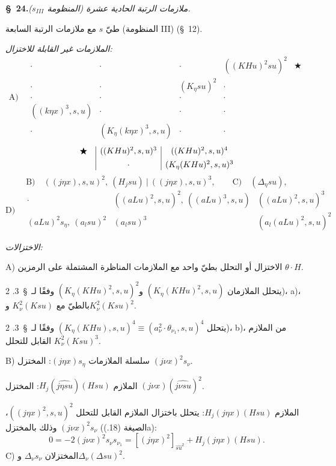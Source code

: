 \documentclass[11pt]{article}
\providecommand{\D}{\Delta}
\begin{document}
\begin{center}\textbf{\S\ 24.}\quad\emph{ملازمات الرتبة الحادية عشرة (المنظومة $s_{III}$).}\end{center}
طيّ $s$ مع ملازمات الرتبة السابعة (المنظومة III) (\S\ 12).

\noindent\emph{الملازمات غير القابلة للاختزال:}
\[
\text{A)}\quad
\begin{array}{c|c|c|c|c}
\cdot&\cdot&\cdot&((KHu)^2su)^2&\bigstar\\[0.35em]
\cdot&\cdot&(K_\eta su)^2&\cdot&\\[0.35em]
\cdot&\cdot&\cdot&\cdot&\\[0.35em]
((k\eta x)^3,s,u)&\cdot&\cdot&\cdot&\\[0.35em]
\cdot&(K_\eta(k\eta x)^3,s,u)&\cdot&\cdot&
\end{array}
\]
\[
\begin{array}{c@{\quad}|c|c}
\bigstar&((KHu)^2,s,u)^3&((KHu)^2,s,u)^4\\[0.45em]
&\cdot&(K_\eta(KHu)^2,s,u)^3
\end{array}
\]
\[
\text{B)}\quad ((j\eta x),s,u)^2,\ (H_jsu)\ \big|\ ((j\eta x),s,u)^3,
\qquad \text{C)}\quad (\D_\eta su),
\]
\[
\text{D)}\quad
\begin{array}{c|c|c}
\cdot&((aLu)^2,s,u)^2,\ ((aLu)^3,s,u)&((aLu)^2,s,u)^3\\[0.5em]
(aLu)^2s_\eta,\ (a_lsu)^2&(a_lsu)^3&(a_l(aLu)^2,s,u)^2
\end{array}
\]

\noindent\emph{الاختزالات:}

A) الاختزال أو التحلل بطيّ واحد مع الملازمات المناظرة المشتملة على الرمزين $\theta\cdot H$.

يتحلل الملازمان $(K_\eta(KHu)^2,s,u)$ و$(K_\eta(KHu)^2,s,u)^2$ وفقًا لـ~\S\ 3. 2)، a)، بالطيّ مع $K_\nu^2(Ksu)$ و$K_\nu^2(Ksu)^2$.

يتحلل $(K_\eta(KHu),s,u)^4\equiv(a_\nu^2\cdot\theta_{\nu_1},s,u)^4$ وفقًا لـ~\S\ 3. 2)، b)، من الملازم القابل للتحلل $K_\nu^2(Ksu)^3$.

B) سلسلة الملازمات $(j\eta x)s_\eta$: المختزل $(j\nu x)^2s_\nu$.

الملازم $H_j(\widehat{j\eta su})(Hsu)$: المختزل $(j\nu x)(\widehat{j\nu su})^2$.

الملازم $H_j(j\eta x)(Hsu)$: يتحلل باختزال الملازم القابل للتحلل $((j\eta x)^2,s,u)^2$، وذلك بالمختزل $(j\nu x)^2s_\nu$ (الصيغة (18.)a):
\[
0=-2(j\nu x)^2s_\nu s_{\nu_1}=[(j\eta x)^2]_{\widehat{su}^2}+H_j(j\eta x)(Hsu).
\]
C) المختزلان $\D_\nu s_\nu$ و$\D_\nu(\D su)^2$.
\end{document}
